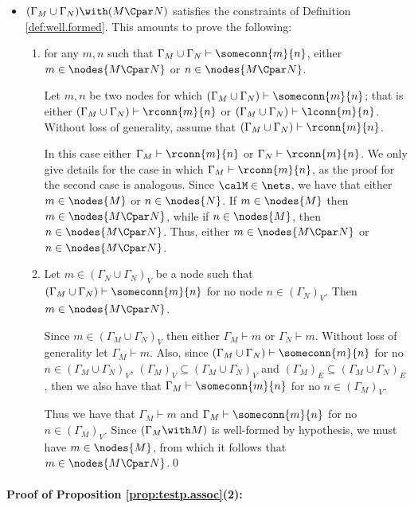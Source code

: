 \documentclass{LMCS}
\begin{document}
\begin{itemize}
\item $(\Gamma_M \cup \Gamma_N) \with (M \Cpar N)$ satisfies the constraints 
of Definition \ref{def:well.formed}. This amounts to prove the following:

\begin{enumerate}

\item for any $m,n$ such that $\Gamma_M \cup \Gamma_N \vdash \someconn{m}{n}$, 
either $m \in \nodes{M \Cpar N}$ or $n \in \nodes{M \Cpar N}$.

Let $m,n$ be two nodes for which $(\Gamma_M \cup \Gamma_N) \vdash \someconn{m}{n}$; 
that is either $(\Gamma_M \cup \Gamma_N) \vdash \rconn{m}{n}$ or $(\Gamma_M \cup \Gamma_N) \vdash \lconn{m}{n}$. 
Without loss of generality, assume that $(\Gamma_M \cup \Gamma_N) \vdash \rconn{m}{n}$.

In this case either $\Gamma_M \vdash \rconn{m}{n}$ or $\Gamma_N \vdash \rconn{m}{n}$. 
We only give details for the case in which $\Gamma_M \vdash \rconn{m}{n}$, as the proof 
for the second case is analogous. 
Since $\calM \in \nets$, we have 
that either $m \in \nodes{M}$ or $n \in \nodes{N}$. 
If $m \in \nodes{M}$ then $m \in \nodes{M \Cpar N}$, while 
if $n \in \nodes{M}$, then $n \in \nodes{M \Cpar N}$. 
Thus, either $m \in \nodes{M \Cpar N}$ or $n \in \nodes{M \Cpar N}$.

\item Let $m \in (\Gamma_N \cup \Gamma_N)_V$ be a node such that $(\Gamma_M \cup \Gamma_N) \vdash \someconn{m}{n}$ 
for no node $n \in (\Gamma_N)_V$. Then $m \in \nodes{M \Cpar N}$.

Since $m \in (\Gamma_M \cup \Gamma_N)_V$ then either $\Gamma_M \vdash m$ or $\Gamma_N \vdash m$. 
Without loss of generality let $\Gamma_M \vdash m$. Also, since $(\Gamma_M \cup \Gamma_N) \vdash \someconn{m}{n}$ 
for no $n \in (\Gamma_M \cup \Gamma_N)_V$, $(\Gamma_M)_V \subseteq (\Gamma_M \cup \Gamma_N)_V$ and $(\Gamma_M)_E \subseteq 
(\Gamma_M \cup \Gamma_N)_E$, then 
we also have that $\Gamma_M \vdash \someconn{m}{n}$ for no $n \in (\Gamma_M)_V$. 

Thus we have that $\Gamma_M \vdash m$ and $\Gamma_M \vdash \someconn{m}{n}$ for no $n \in (\Gamma_M)_V$. 
Since $(\Gamma_M \with M)$ is well-formed by hypothesis, we must have $m \in \nodes{M}$, from which it 
follows that $m \in \nodes{M \Cpar N}$.\qed
\end{enumerate}
\end{itemize}

\paragraph{\textbf{Proof of Proposition \ref{prop:testp.assoc}(2)}:}
\label{proof:testP.assoc}
\end{document}
